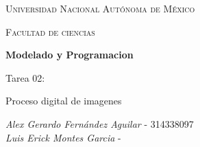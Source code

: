 \documentclass[10pt,letterpaper,fleqn]{article}
\begin{document}
\begin{titlepage}
    \centering

    {\scshape\LARGE Universidad Nacional Autónoma de México \par}

    \vspace{.5cm}
    {\scshape\Large Facultad de ciencias\par}
    \vspace{2cm}
    
    {\huge \bfseries Modelado y Programacion \par}
    {\huge Tarea 02: \par}
    {\huge Proceso digital de imagenes\par}
    
    \vspace{1cm}
    
    \large{\itshape{Alex Gerardo Fernández Aguilar}} \small{ - 314338097} \\ 
    \large{\itshape{Luis Erick Montes Garcia}} \small{ - } \\ 
    
\end{titlepage}
    
\end{document}
